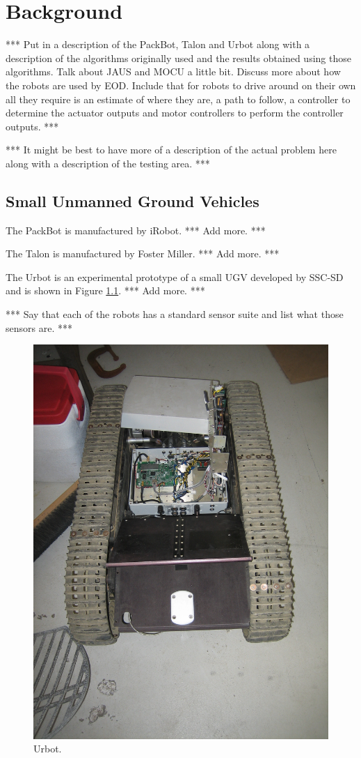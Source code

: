 \chapter{Background}
\label{ch:background}
*** Put in a description of the PackBot, Talon and Urbot along with a description of the algorithms originally used and the results obtained using those algorithms. Talk about JAUS and MOCU a little bit. Discuss more about how the robots are used by EOD. Include that for robots to drive around on their own all they require is an estimate of where they are, a path to follow, a controller to determine the actuator outputs and motor controllers to perform the controller outputs. ***

*** It might be best to have more of a description of the actual problem here along with a description of the testing area. ***

\section{Small Unmanned Ground Vehicles}
\label{sec:smallugvs}
The PackBot is manufactured by iRobot. *** Add more. ***

The Talon is manufactured by Foster Miller. *** Add more. ***

The Urbot is an experimental prototype of a small UGV developed by SSC-SD and is shown in Figure \ref{fig:urbot}. *** Add more. ***

*** Say that each of the robots has a standard sensor suite and list what those sensors are. ***

\begin{figure}[ht!]
	\centering
	\includegraphics[width=.5\textwidth]{images/urbot}
	\caption{Urbot.}
	\label{fig:urbot}
\end{figure}

